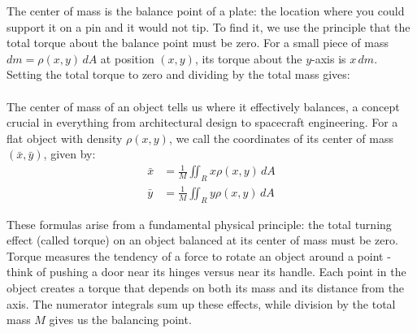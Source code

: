 \noindent The center of mass is the balance point of a plate: the location where you could support it on a pin and it would not tip. To find it, we use the principle that the total torque about the balance point must be zero. For a small piece of mass \( dm = \rho(x,y) \, dA \) at position \( (x, y) \), its torque about the \( y \)-axis is \( x \, dm \). Setting the total torque to zero and dividing by the total mass gives:\\ \\

\noindent The center of mass of an object tells us where it effectively balances, a concept crucial in everything from architectural design to spacecraft engineering. For a flat object with density $\rho(x,y)$, we call the coordinates of its center of mass $(\bar{x}, \bar{y})$, given by:
\begin{align*}
\bar{x} &= \frac{1}{M}\iint_R x\rho(x,y)\,dA \\
\bar{y} &= \frac{1}{M}\iint_R y\rho(x,y)\,dA
\end{align*}

\noindent These formulas arise from a fundamental physical principle: the total turning effect (called torque) on an object balanced at its center of mass must be zero. Torque measures the tendency of a force to rotate an object around a point - think of pushing a door near its hinges versus near its handle. Each point in the object creates a torque that depends on both its mass and its distance from the axis. The numerator integrals sum up these effects, while division by the total mass $M$ gives us the balancing point.

